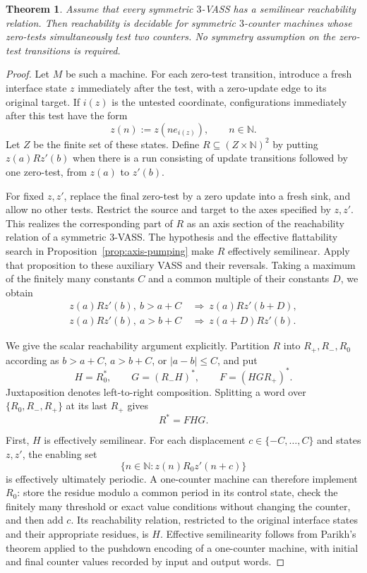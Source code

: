 \documentclass[11pt]{article}
\newtheorem{theorem}{Theorem}
\begin{document}
\begin{theorem}\label{thm:pair-tests}
Assume that every symmetric $3$-VASS has a semilinear reachability
relation. Then reachability is decidable for symmetric
$3$-counter machines whose zero-tests simultaneously test two
counters. No symmetry assumption on the zero-test transitions
is required.
\end{theorem}

\begin{proof}
Let $M$ be such a machine. For each zero-test transition, introduce
a fresh interface state $z$ immediately after the test, with a
zero-update edge to its original target. If $i(z)$ is the untested
coordinate, configurations immediately after this test have the form
\[
  z(n):=z(ne_{i(z)}),\qquad n\in\mathbb{N}.
\]
Let $Z$ be the finite set of these states. Define
$R\subseteq(Z\times\mathbb{N})^2$ by putting $z(a)Rz'(b)$ when
there is a run consisting of update transitions followed by one
zero-test, from $z(a)$ to $z'(b)$.

For fixed $z,z'$, replace the final zero-test by a zero update into
a fresh sink, and allow no other tests. Restrict the source and
target to the axes specified by $z,z'$. This realizes the
corresponding part of $R$ as an axis section of the reachability
relation of a symmetric $3$-VASS. The hypothesis and the effective
flattability search in Proposition~\ref{prop:axis-pumping} make $R$
effectively semilinear. Apply that proposition to these auxiliary
VASS and their reversals. Taking a maximum of the finitely many
constants $C$ and a common multiple of their constants $D$, we obtain
\begin{align*}
  z(a)Rz'(b),\ b>a+C&\ \Longrightarrow\ z(a)Rz'(b+D),\\
  z(a)Rz'(b),\ a>b+C&\ \Longrightarrow\ z(a+D)Rz'(b).
\end{align*}

We give the scalar reachability argument explicitly. Partition $R$
into $R_+,R_-,R_0$ according as $b>a+C$, $a>b+C$, or
$|a-b|\leq C$, and put
\[
  H=R_0^*,\qquad G=(R_-H)^*,\qquad F=(HGR_+)^*.
\]
Juxtaposition denotes left-to-right composition. Splitting a word
over $\{R_0,R_-,R_+\}$ at its last $R_+$ gives
\begin{equation}\label{eq:scalar-decomposition}
  R^*=FHG.
\end{equation}

First, $H$ is effectively semilinear. For each displacement
$c\in\{-C,\ldots,C\}$ and states $z,z'$, the enabling set
\[
  \{n\in\mathbb{N}:z(n)R_0z'(n+c)\}
\]
is effectively ultimately periodic. A one-counter machine can
therefore implement $R_0$: store the residue modulo a common period
in its control state, check the finitely many threshold or exact
value conditions without changing the counter, and then add $c$.
Its reachability relation, restricted to the original interface
states and their appropriate residues, is $H$. Effective
semilinearity follows from Parikh's theorem applied to the pushdown
encoding of a one-counter machine, with initial and final counter
values recorded by input and output words.


\end{proof}
\end{document}

